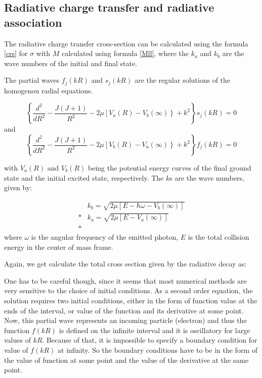 \subsection{ Radiative charge transfer and radiative association}

The radiative charge transfer cross-section can be calculated using the formula \eqref{crs} for $ \sigma $ with $ M $ calculated using formula \eqref{Mll}, where the $ k_a $ and $ k_b $ are the wave numbers of the initial and final state. 

The partial waves $ f_j(kR) $ and $ s_j(kR) $ are the regular solutions of the homogenou radial equations.

\begin{equation}
\left\{\frac{d^2}{dR^2} - \frac{J(J+1)}{R^2} - 2\mu\left[V_a(R) - V_b(\infty)\right\} + k^2\right\}s_j(kR) = 0
\end{equation}
and
\begin{equation}
\left\{\frac{d^2}{dR^2} - \frac{J(J+1)}{R^2} - 2\mu\left[V_b(R) - V_a(\infty)\right\} + k^2\right\}f_j(kR) = 0
\end{equation}

with $ V_a(R) $ and $ V_b(R) $ being the potential energy curves of the final ground state and the initial excited state, respectively. The $ k $s are the wave numbers, given by:

\begin{equation}
\begin{split}
& k_b = \sqrt{2\mu\left[E - \hbar\omega - V_b(\infty)\right]} \\*
& k_a = \sqrt{2\mu\left[E - V_a(\infty)\right]} \\*
\end{split}
\end{equation}
where $ \omega$ is the angular frequency of the emitted photon, $ E $ is the total collision energy in the center of mass frame.

Again, we get calculate the total cross section given by the radiative decay as:




One has to be careful though, since it seems that most numerical methods are very sensitive to the choice of initial conditions.  As a second order equation, the solution requires two initial conditions, either in the form of function value at the ends of the interval, or value of the function and its derivative at some point. Now, this partial wave represents an incoming particle (electron) and thus the function  $  f(kR) $  is defined on the infinite interval and it is oscillatory for large values of $ kR $. Because of that, it is impossible to specify a boundary condition for value of $  f(kR) $ at infinity. So the boundary conditions have to be in the form of the value of function at some point and the value of the derivative at the same point. 

